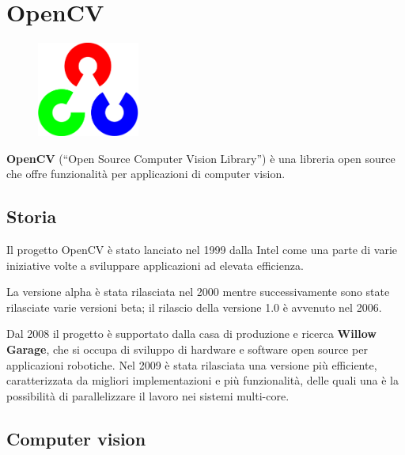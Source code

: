 \section{OpenCV}

\begin{figure}[htbp]
\centering
\includegraphics[width=0.3\textwidth]{images/openCV/opencv-logo.png}
\end{figure}


\textbf{OpenCV} (“Open Source Computer Vision Library”) è una libreria open source che offre funzionalità per applicazioni di computer vision.

\subsection{Storia}
Il progetto OpenCV è stato lanciato nel 1999 dalla Intel come una parte di varie iniziative volte a sviluppare applicazioni ad elevata efficienza.\cite{opencv1}

La versione alpha è stata rilasciata nel 2000 mentre successivamente sono state rilasciate varie versioni beta; il rilascio della versione 1.0 è avvenuto
nel 2006.

Dal 2008 il progetto è supportato dalla casa di produzione e ricerca \textbf{Willow Garage}, che si occupa di sviluppo di hardware e software open source per applicazioni robotiche. Nel 2009 è stata rilasciata una versione più efficiente, caratterizzata da migliori implementazioni e più funzionalità, delle quali una è la possibilità di parallelizzare il lavoro nei sistemi multi-core.

\subsection{Computer vision}

